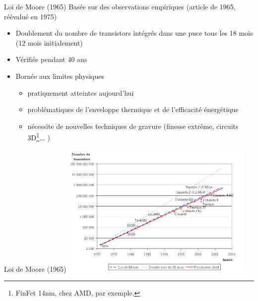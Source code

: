 \begin{frame}{Loi de Moore (1965)}
Basée sur des observations empiriques (article de 1965, réévalué en 1975)
\begin{itemize}
\item Doublement du nombre de transistors intégrés dans une puce tous les 18 mois (12 mois initialement)
\item Vérifiée pendant 40 ans
\item Bornée aux limites physiques
\begin{itemize}
\item pratiquement atteintes aujourd'hui
\item problématiques de l'enveloppe thermique et de l'efficacité énergétique
\item nécessite de nouvelles techniques de gravure (finesse extrême, circuits 3D\footnote{FinFet 14nm, chez AMD, par exemple.}... )
\end{itemize}
\end{itemize}
\end{frame}


\begin{frame}{Loi de Moore (1965)}
\includegraphics[height=6.5cm]{../illustration/Evolutionprocesseurs.png}
\end{frame}


